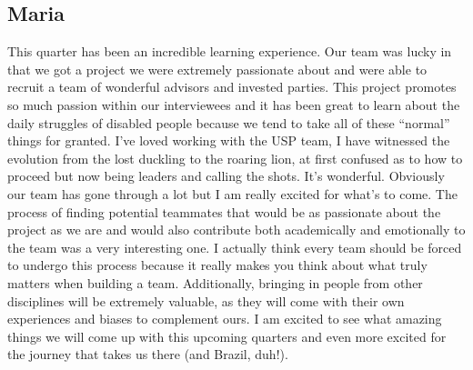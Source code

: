\subsection{Maria}
This quarter has been an incredible learning experience. Our team was lucky in that we got a project we were extremely passionate about and were able to recruit a team of wonderful advisors and invested parties. This project promotes so much passion within our interviewees and it has been great to learn about the daily struggles of disabled people because we tend to take all of these “normal” things for granted. I’ve loved working with the USP team, I have witnessed the evolution from the lost duckling to the roaring lion, at first confused as to how to proceed but now being leaders and calling the shots. It’s wonderful. Obviously our team has gone through a lot but I am really excited for what’s to come. The process of finding potential teammates that would be as passionate about the project as we are and would also contribute both academically and emotionally to the team was a very interesting one. I actually think every team should be forced to undergo this process because it really makes you think about what truly matters when building a team. Additionally, bringing in people from other disciplines will be extremely valuable, as they will come with their own experiences and biases to complement ours. I am excited to see what amazing things we will come up with this upcoming quarters and even more excited for the journey that takes us there (and Brazil, duh!).